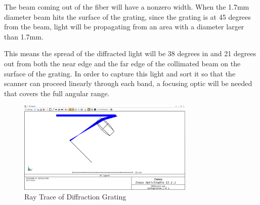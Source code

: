 The beam coming out of the fiber will have a nonzero width. When the 1.7mm diameter beam hits the surface of the grating, since the grating is at 45 degrees from the beam, light will be propagating from an area with a diameter larger than 1.7mm.


This means the spread of the diffracted light will be 38 degrees in and 21 degrees out from both the near edge and the far edge of the collimated beam on the surface of the grating. In order to capture this light and sort it so that the scanner can proceed linearly through each band, a focusing optic will be needed that covers the full angular range.

\begin{figure}[H]
    \caption{Ray Trace of Diffraction Grating}
    \centering
    \includegraphics[width=0.75\textwidth]{images/Zemax Ray Trace.png}
\end{figure}

